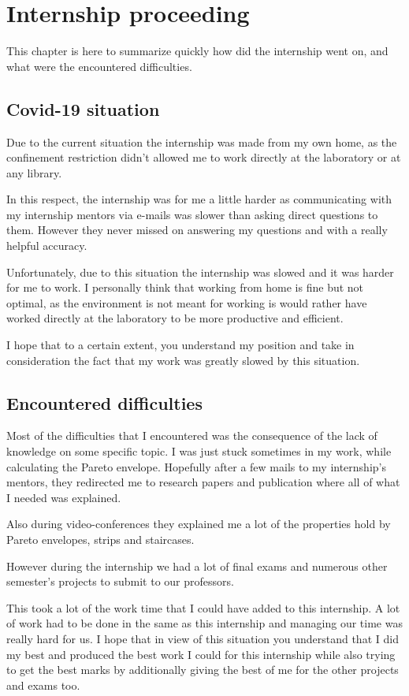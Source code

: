 \chapter{Internship proceeding}
This chapter is here to summarize quickly how did the internship went on, and what were the encountered difficulties.
\section{Covid-19 situation}
Due to the current situation the internship was made from my own home, as the confinement restriction didn't allowed me to work directly at the laboratory or at any library.

In this respect, the internship was for me a little harder as communicating with my internship mentors via e-mails was slower than asking direct questions to them. However they never missed on answering my questions and with a really helpful accuracy.

Unfortunately, due to this situation the internship was slowed and it was harder for me to work. I personally think that working from home is fine but not optimal, as the environment is not meant for working is would rather have worked directly at the laboratory to be more productive and efficient.

I hope that to a certain extent, you understand my position and take in consideration the fact that my work was greatly slowed by this situation.
\section{Encountered difficulties}
Most of the difficulties that I encountered was the consequence of the lack of knowledge on some specific topic. I was just stuck sometimes in my work, while calculating the Pareto envelope. Hopefully after a few mails to my internship's mentors, they redirected me to research papers and publication where all of what I needed was explained.

Also during video-conferences they explained me a lot of the properties hold by Pareto envelopes, strips and staircases.\newline

However during the internship we had a lot of final exams and numerous other semester's projects to submit to our professors.

 This took a lot of the work time that I could have added to this internship. A lot of work had to be done in the same as this internship and managing our time was really hard for us. I hope that in view of this situation you understand that I did my best and produced the best work I could for this internship while also trying to get the best marks by additionally giving the best of me for the other projects and exams too.

